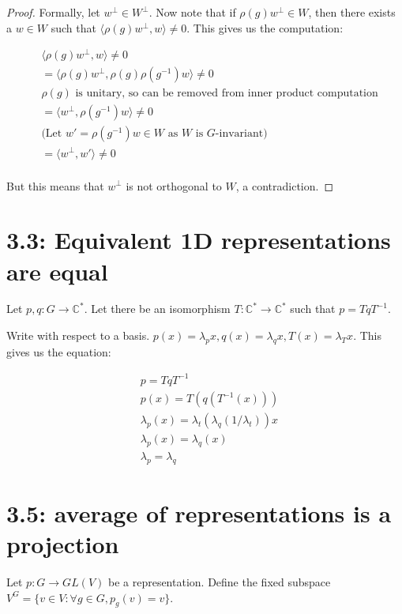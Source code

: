 \documentclass{book}
\newcommand{\C}{\ensuremath{\mathbb{C}}}
\newcommand{\inv}{{\ensuremath{-1}}}
\theoremstyle{definition}
\begin{document}
\begin{proof}
Formally, let $w^\perp \in W^\perp$. Now note that if $\rho(g) w^\perp \in W$,
then there exists a $w \in W$ such that $\langle \rho(g)w^{\perp}, w \rangle \neq 0$.
This gives us the computation:

\begin{align*}
&\langle \rho(g)w^{\perp}, w \rangle \neq 0 \\ 
&=\langle \rho(g)w^{\perp}, \rho(g) \rho(g^{-1}) w \rangle \neq 0 \\ 
&\text{$\rho(g)$ is unitary, so can be removed from inner product computation} \\
&= \langle w^{\perp}, \rho(g^{-1}) w \rangle \neq 0 \\ 
&\text{(Let $w' = \rho(g^{-1})w \in W$ as $W$ is $G$-invariant)} \\
&= \langle w^{\perp}, w'\rangle \neq 0 \\ 
\end{align*}

But this means that $w^{\perp}$ is not orthogonal to $W$, a contradiction. 

\end{proof}


\section{3.3: Equivalent 1D representations are equal}

Let $p, q : G \rightarrow \C^*$. Let there be an isomorphism $T: \C^*  \rightarrow \C^*$
such that $p = Tq T^{-1}$. 

Write with respect to a basis. $p(x) = \lambda_p x, q(x) = \lambda_q x, T(x) = \lambda_Tx $.
This gives us the equation:

\begin{align*}
&p = T q T^\inv \\
&p(x) = T(q(T^\inv(x))) \\
&\lambda_p(x) = \lambda_t(\lambda_q(1/\lambda_t))x \\
&\lambda_p(x) = \lambda_q(x) \\
&\lambda_p = \lambda_q
\end{align*}

\section{3.5: average of representations is a projection}
Let $p: G \rightarrow GL(V)$ be a representation. Define the fixed
subspace $V^G = \{ v \in V : \forall g \in G, p_g(v)  = v \}$.
\end{document}
